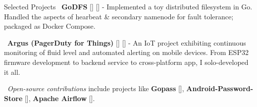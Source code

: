 \documentclass{resume}
\begin{document}
\begin{rSection}{Selected Projects}
  \textbullet\ \textbf{\textsf{GoDFS}} [\textbf{\href{https://rounakdatta.github.io/posts/godfs}{}}] [\textbf{\href{https://github.com/rounakdatta/GoDFS}{}}] -  Implemented a  toy distributed filesystem in Go. Handled the aspects of hearbeat \& secondary namenode for fault tolerance; packaged as Docker Compose.

  \textbullet\ \textbf{\textsf{Argus (PagerDuty for Things)}} [\textbf{\href{https://rounakdatta.github.io/posts/pagerduty-for-iot}{}}] [\textbf{\href{https://github.com/rounakdatta?tab=repositories&q=argus}{}}] - An IoT project exhibiting continuous monitoring of fluid level and automated alerting on mobile devices. From ESP32 firmware development to backend service to cross-platform app, I solo-developed it all.

  \textbullet\ \emph{Open-source contributions} include projects like \textbf{\textsf{Gopass}} [\textbf{\href{https://github.com/gopasspw/gopassbridge}{}}], \textbf{\textsf{Android-Password-Store}} [\textbf{\href{https://github.com/android-password-store/Android-Password-Store}{}}], \textbf{\textsf{Apache Airflow}} [\textbf{\href{https://github.com/apache/airflow}{}}].

\end{rSection}
\end{document}
